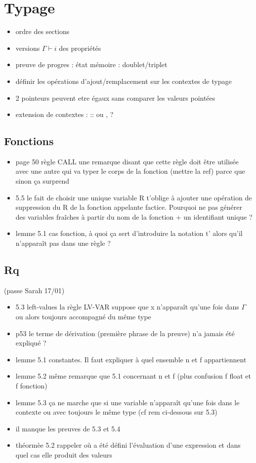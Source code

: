 \section{Typage}%

\begin{itemize}
\item ordre des sections
\item versions $Γ ⊢ i$ des propriétés
\item preuve de progres : état mémoire : doublet/triplet
\item définir les opérations d'ajout/remplacement sur les contextes de typage
\item 2 pointeurs peuvent etre égaux sans comparer les valeurs pointées
\item extension de contextes : :: ou , ?
\end{itemize}

\subsection*{Fonctions}

\begin{itemize}
\item
  page 50 règle CALL une remarque disant que cette règle doit être
  utilisée avec une autre qui va typer le corps de la fonction (mettre
  la ref) parce que sinon ça surprend
\item
  5.5 le fait de choisir une unique variable R t'oblige à ajouter une
  opération de suppression du R de la fonction appelante factice.
  Pourquoi ne pas générer des variables fraîches à partir du nom de la
  fonction + un identifiant unique ?
\item
  lemme 5.1 cas fonction, à quoi ça sert d'introduire la notation t'
  alors qu'il n'apparaît pas dans une règle ?
\end{itemize}

\subsection*{Rq}
(passe Sarah 17/01)

\begin{itemize}
\item
  5.3 left-values la règle LV-VAR suppose que x n'apparaît qu'une fois
  dans $\Gamma$ ou alors toujours accompagné du même type
\item
  p53 le terme de dérivation (première phrase de la preuve) n'a jamais
  été expliqué ?
\item
  lemme 5.1 constantes. Il faut expliquer à quel ensemble n et f
  appartiennent
\item
  lemme 5.2 même remarque que 5.1 concernant n et f (plus confusion f
  float et f fonction)
\item
  lemme 5.3 ça ne marche que si une variable n'apparaît qu'une fois dans
  le contexte ou avec toujours le même type (cf rem ci-dessous sur 5.3)
\item
  il manque les preuves de 5.3 et 5.4
\item
  théormèe 5.2 rappeler où a été défini l'évaluation d'une expression et
  dans quel cas elle produit des valeurs
\end{itemize}%

